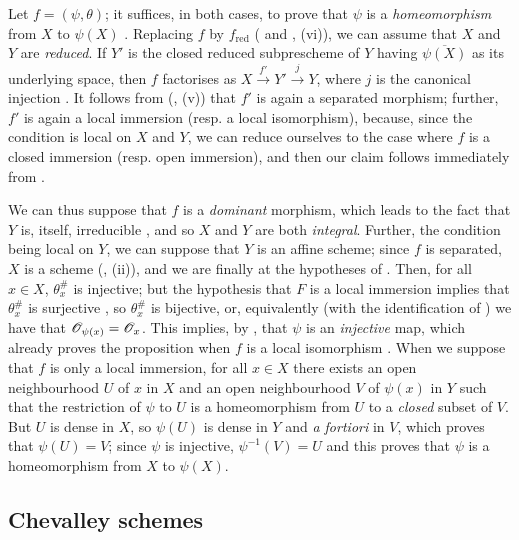 \documentclass[10pt,oneside]{book}
\begin{document}
Let $f=(\psi,\theta)$; it suffices, in both cases, to prove that $\psi$ is a
\emph{homeomorphism} from $X$ to $\psi(X)$ . Replacing $f$ by
$f_\mathrm{red}$ ( and , (vi)), we can assume that $X$
and $Y$ are \emph{reduced}. If $Y'$ is the closed reduced subprescheme of $Y$
having $\overline{\psi(X)}$ as its underlying space, then $f$ factorises as
$X\xrightarrow{f'}Y'\xrightarrow{j}Y$, where $j$ is the canonical injection
. It follows from (, (v)) that $f'$ is again a
separated morphism; further, $f'$ is again
a local immersion (resp. a local isomorphism), because, since the condition is local on $X$
and $Y$, we can reduce ourselves to the case where $f$ is a closed immersion (resp. open
immersion), and then our claim follows immediately from .

We can thus suppose that $f$ is a \emph{dominant} morphism, which leads to the
fact that $Y$ is, itself, irreducible , and so $X$ and $Y$
are both \emph{integral}. Further, the condition being local on $Y$, we can
suppose that $Y$ is an affine scheme; since $f$ is separated, $X$ is a scheme
(, (ii)), and we are finally at the hypotheses of .
Then, for all $x\in X$, $\theta_x^\#$ is injective; but the hypothesis that $F$
is a local immersion implies that $\theta_x^\#$ is surjective , so
$\theta_x^\#$ is bijective, or, equivalently (with the identification of
) we have that $\mathscr{O}_{\psi(x)}=\mathscr{O}_x$. This implies, by ,
that $\psi$ is an \emph{injective} map, which already proves the proposition
when $f$ is a local isomorphism . When we suppose that $f$ is only
a local immersion, for all $x\in X$ there exists an open neighbourhood $U$ of
$x$ in $X$ and an open neighbourhood $V$ of $\psi(x)$ in $Y$ such that the
restriction of $\psi$ to $U$ is a homeomorphism from $U$ to a \emph{closed}
subset of $V$. But $U$ is dense in $X$, so $\psi(U)$ is dense in $Y$ and
\emph{a fortiori} in $V$, which proves that $\psi(U)=V$; since $\psi$ is
injective, $\psi^{-1}(V)=U$ and this proves that $\psi$ is a homeomorphism from
$X$ to $\psi(X)$.

\subsection{Chevalley schemes}
\label{1-schemes-8.3}
\end{document}
